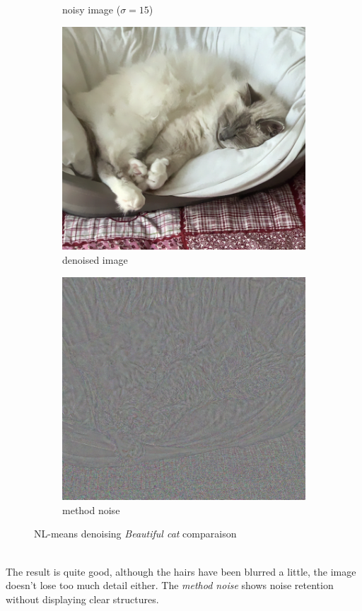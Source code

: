 \documentclass[a4paper, twocolumn, twoside]{article}
\begin{document}
\begin{figure}[h!]
\begin{subfigure}{.24\textwidth}
        \caption{noisy image ($\sigma = 15$)}
    \end{subfigure}
    \hfill
    \begin{subfigure}{.24\textwidth}
        \centering
        \includegraphics[width=\linewidth]{images/denoised_cat.png}
        \caption{denoised image}
    \end{subfigure}
	\hfill
    \begin{subfigure}{.24\textwidth}
        \centering
        \includegraphics[width=\linewidth]{images/method_noise_cat.png}
        \caption{method noise}
    \end{subfigure}
	\caption{NL-means denoising \textit{Beautiful cat} \cite{cat} comparaison}
\end{figure}\\
The result is quite good, although the hairs have been blurred a little, the image doesn't lose too much detail either.
The \textit{method noise} shows noise retention without displaying clear structures.
\nocite{*}
\printbibliography
\end{document}
